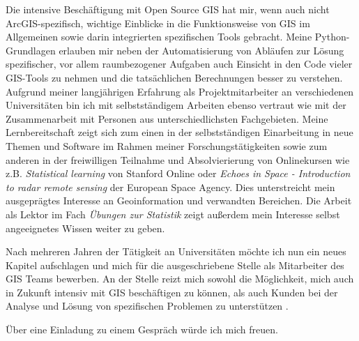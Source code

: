 \documentclass[11pt,a4paper,sans]{moderncv}        %
\begin{document}
Die intensive Besch\"aftigung mit Open Source GIS hat mir, wenn auch nicht ArcGIS-spezifisch, wichtige Einblicke in die Funktionsweise von GIS im Allgemeinen sowie darin integrierten  spezifischen Tools gebracht. Meine Python-Grundlagen erlauben mir neben der Automatisierung von Abl\"aufen zur L\"osung spezifischer, vor allem raumbezogener Aufgaben auch Einsicht in den Code vieler GIS-Tools zu nehmen und die tats\"achlichen Berechnungen besser zu verstehen. Aufgrund meiner langj\"{a}hrigen Erfahrung als Projektmitarbeiter an verschiedenen Universit\"{a}ten bin ich mit selbstst\"andigem Arbeiten ebenso vertraut wie mit der Zusammenarbeit mit Personen aus unterschiedlichsten Fachgebieten. Meine Lernbereitschaft zeigt sich zum einen in der selbstst\"andigen Einarbeitung in neue Themen und Software im Rahmen meiner Forschungst\"atigkeiten sowie zum anderen in der freiwilligen Teilnahme und  Absolvierierung von Onlinekursen wie z.B. \emph{Statistical learning} von Stanford Online oder \emph{Echoes in Space - Introduction to radar remote sensing} der European Space Agency. Dies unterstreicht mein ausgepr\"agtes Interesse an Geoinformation und verwandten Bereichen. Die Arbeit als Lektor im Fach \emph{\"Ubungen zur Statistik} zeigt au{\ss}erdem mein Interesse selbst angeeignetes Wissen weiter zu geben.

Nach mehreren Jahren der T\"atigkeit an Universit\"aten m\"ochte ich nun ein neues Kapitel aufschlagen und mich f\"ur die ausgeschriebene Stelle als Mitarbeiter des GIS Teams bewerben. An der Stelle reizt mich sowohl die M\"oglichkeit, mich auch in Zukunft intensiv mit GIS besch\"aftigen zu k\"onnen, als auch  Kunden bei der Analyse und L\"osung von spezifischen Problemen zu unterst\"utzen .

\"Uber eine Einladung zu einem Gespr\"ach w\"urde ich mich freuen.

\makeletterclosing
\clearpage
\makecvtitle
\end{document}
